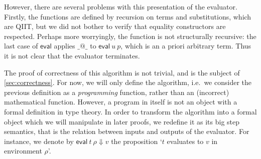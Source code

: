 \documentclass[a4paper,UKenglish,cleveref]{lipics-v2019}
\newcommand{\agdaSymb}[1]{\mathsf{#1}}
\newcommand{\eval}{\agdaSymb{eval}}
\newcommand{\Da}{\Downarrow}
\begin{document}
However, there are several problems with this presentation of the evaluator.
Firstly, the functions are defined by recursion on terms and substitutions,
which are QIIT, but we did not bother to verify that equality constructors
are respected. Perhaps more worryingly, the function is not structurally
recursive: the last case of $\eval$ applies $\_@\_$ to $\eval\ u\ p$, which
is an a priori arbitrary term. Thus it is not clear that the evaluator
terminates.

The proof of correctness of this algorithm is not trivial, and is the subject
of \cref{sec:correctness}. For now, we will only define the algorithm, i.e.\
we consider the previous definition as a \emph{programming} function, rather
than an (incorrect) mathematical function. However, a program in itself is not
an object with a formal definition in type theory. In order to transform the
algorithm into a formal object which we will manipulate in later proofs, we
redefine it as its big step semantics, that is the relation between inputs and
outputs of the evaluator. For instance, we denote by $\eval\ t\ \rho \Da v$
the proposition `$t$ evaluates to $v$ in environment $\rho$'.
\end{document}
